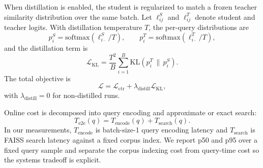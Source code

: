 When distillation is enabled, the student is regularized to match a frozen teacher similarity distribution over the same batch. Let $\ell^{S}_{ij}$ and $\ell^{T}_{ij}$ denote student and teacher logits. With distillation temperature $T$, the per-query distributions are
\begin{equation}
p^{S}_{i} = \mathrm{softmax}\!\left(\ell^{S}_{i\cdot}/T\right), \qquad
p^{T}_{i} = \mathrm{softmax}\!\left(\ell^{T}_{i\cdot}/T\right),
\end{equation}
and the distillation term is
\begin{equation}
\mathcal{L}_{\mathrm{KL}} = \frac{T^2}{B}\sum_{i=1}^B \mathrm{KL}\!\left(p^T_i \,\|\, p^S_i\right).
\end{equation}
The total objective is
\begin{equation}
\mathcal{L} = \mathcal{L}_{\mathrm{ctr}} + \lambda_{\mathrm{distill}} \mathcal{L}_{\mathrm{KL}},
\end{equation}
with $\lambda_{\mathrm{distill}} = 0$ for non-distilled runs.

Online cost is decomposed into query encoding and approximate or exact search:
\begin{equation}
T_{\mathrm{e2e}}(q) = T_{\mathrm{encode}}(q) + T_{\mathrm{search}}(q).
\end{equation}
In our measurements, $T_{\mathrm{encode}}$ is batch-size-1 query encoding latency and $T_{\mathrm{search}}$ is FAISS search latency against a fixed corpus index. We report p50 and p95 over a fixed query sample and separate the corpus indexing cost from query-time cost so the systems tradeoff is explicit.
